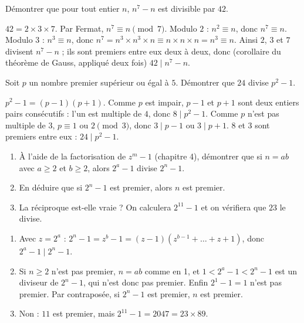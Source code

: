 \begin{exercise}
Démontrer que pour tout entier $n$, $n^7-n$ est divisible par $42$.
\end{exercise}
\begin{solution}
$42=2\times3\times7$. Par Fermat, $n^7\equiv n\pmod7$. Modulo $2$ : $n^2\equiv n$, donc $n^7\equiv n$. Modulo $3$ : $n^3\equiv n$, donc $n^7=n^3\times n^3\times n\equiv n\times n\times n=n^3\equiv n$. Ainsi $2$, $3$ et $7$ divisent $n^7-n$ ; ils sont premiers entre eux deux à deux, donc (corollaire du théorème de Gauss, appliqué deux fois) $42\mid n^7-n$.
\end{solution}

\begin{exercise}
Soit $p$ un nombre premier supérieur ou égal à $5$. Démontrer que $24$ divise $p^2-1$.
\end{exercise}
\begin{solution}
$p^2-1=(p-1)(p+1)$. Comme $p$ est impair, $p-1$ et $p+1$ sont deux entiers pairs consécutifs : l'un est multiple de $4$, donc $8\mid p^2-1$. Comme $p$ n'est pas multiple de $3$, $p\equiv1$ ou $2\pmod3$, donc $3\mid p-1$ ou $3\mid p+1$. $8$ et $3$ sont premiers entre eux : $24\mid p^2-1$.
\end{solution}

\begin{exercise}
\begin{enumerate}
\item À l'aide de la factorisation de $z^m-1$ (chapitre 4), démontrer que si $n=ab$ avec $a\ge2$ et $b\ge2$, alors $2^a-1$ divise $2^n-1$.
\item En déduire que si $2^n-1$ est premier, alors $n$ est premier.
\item La réciproque est-elle vraie ? On calculera $2^{11}-1$ et on vérifiera que $23$ le divise.
\end{enumerate}
\end{exercise}
\begin{solution}
\begin{enumerate}
\item Avec $z=2^a$ : $2^n-1=z^b-1=(z-1)\left(z^{b-1}+\dots+z+1\right)$, donc $2^a-1\mid2^n-1$.
\item Si $n\ge2$ n'est pas premier, $n=ab$ comme en 1, et $1<2^a-1<2^n-1$ est un diviseur de $2^n-1$, qui n'est donc pas premier. Enfin $2^1-1=1$ n'est pas premier. Par contraposée, si $2^n-1$ est premier, $n$ est premier.
\item Non : $11$ est premier, mais $2^{11}-1=\num{2047}=23\times89$.
\end{enumerate}
\end{solution}

